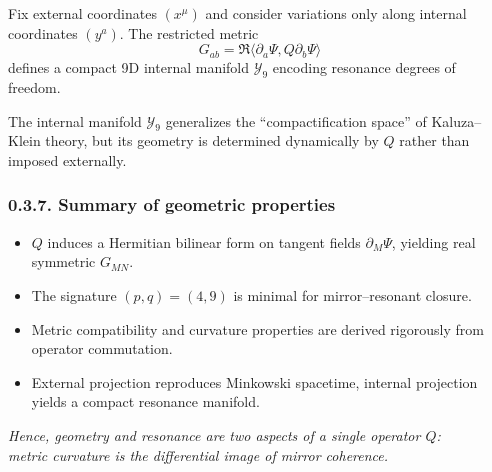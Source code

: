 \begin{proposition}
Fix external coordinates $(x^\mu)$ and consider variations only along internal coordinates $(y^a)$.
The restricted metric
\[
G_{ab}=\Re\langle \partial_a\Psi,Q\partial_b\Psi\rangle
\]
defines a compact 9D internal manifold $\mathcal{Y}_9$ encoding resonance degrees of freedom.
\end{proposition}

\begin{remark}
The internal manifold $\mathcal{Y}_9$ generalizes the ``compactification space'' of Kaluza–Klein theory,
but its geometry is determined dynamically by $Q$ rather than imposed externally.
\end{remark}

\subsubsection*{0.3.7. Summary of geometric properties}

\begin{itemize}
  \item $Q$ induces a Hermitian bilinear form on tangent fields $\partial_M\Psi$, yielding real symmetric $G_{MN}$.
  \item The signature $(p,q)=(4,9)$ is minimal for mirror–resonant closure.
  \item Metric compatibility and curvature properties are derived rigorously from operator commutation.
  \item External projection reproduces Minkowski spacetime, internal projection yields a compact resonance manifold.
\end{itemize}

\begin{flushright}
\textit{Hence, geometry and resonance are two aspects of a single operator $Q$:\\
metric curvature is the differential image of mirror coherence.}
\end{flushright}


